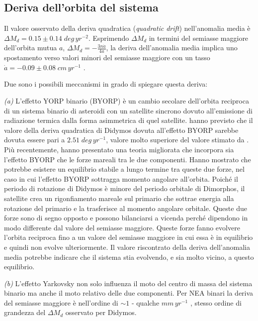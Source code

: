 \documentclass[a4paper,11pt,openright]{book}
\begin{document}
\subsection{Deriva dell'orbita del sistema}

Il valore osservato della deriva quadratica (\textit{quadratic drift}) nell'anomalia media è $\Delta M_d=0.15\pm 0.14\; deg\,yr^{-2}$. Esprimendo $\Delta M_d$ in termini del semiasse maggiore dell'orbita mutua $a$, $\Delta M_d=-\frac{3n\dot{a}}{4a}$, la deriva dell'anomalia media implica uno spostamento verso valori minori del semiasse maggiore con un tasso \\$\dot{a}=-0.09 \pm 0.08\;cm\,yr^{-1}$ \citep{scheirich_preimpact_2022}. 

Due sono i possibili meccanismi in grado di spiegare questa deriva:

\qquad \textit{(a)} L'effetto YORP binario (BYORP) è un cambio secolare dell'orbita reciproca di un sistema binario di asteroidi con un satellite sincrono dovuto all'emissione di radiazione termica dalla forma asimmetrica di quel satellite. \citet{pravec_binary_2010} hanno previsto che il valore della deriva quadratica di Didymos dovuta all'effetto BYORP sarebbe dovuta essere pari a $2.51\;deg\,yr^{-1}$, valore molto superiore del valore stimato da \citet{scheirich_preimpact_2022}. Più recentemente, \citet{jacobson_dynamics_2011} hanno presentato una teoria migliorata che incorpora sia l'effetto BYORP che le forze mareali tra le due componenti. Hanno mostrato che potrebbe esistere un equilibrio stabile a lungo termine tra queste due forze, nel caso in cui l'effetto BYORP sottragga momento angolare all'orbita. Poiché il periodo di rotazione di Didymos è minore del periodo orbitale di Dimorphos, il satellite crea un rigonfiamento mareale sul primario che sottrae energia alla rotazione del primario e la trasferisce al momento angolare orbitale. Queste due forze sono di segno opposto e possono bilanciarsi a vicenda perché dipendono in modo differente dal valore del semiasse maggiore. Queste forze fanno evolvere l'orbita reciproca fino a un valore del semiasse maggiore in cui essa è in equilibrio e quindi non evolve ulteriormente. Il valore riscontrato della deriva dell'anomalia media potrebbe indicare che il sistema stia evolvendo, e sia molto vicino, a questo equilibrio.

\qquad \textit{(b)} L'effetto Yarkovsky non solo influenza il moto del centro di massa del sistema binario ma anche il moto relativo delle due componenti. Per NEA binari la deriva del semiasse maggiore è nell'ordine di $\sim 1$ - qualche $mm\,yr^{-1}$ \citep{scheirich_satellite_2021}, stesso ordine di grandezza del $\Delta M_d$ osservato per Didymos.
\end{document}
